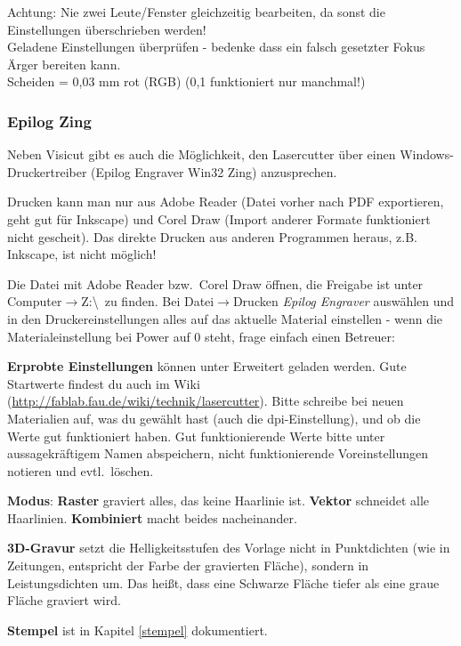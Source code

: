 \documentclass{\basedir/fablab-document}
\renewcommand{\todo}[1]{\textbf{\color{red}{TODO: #1}}}
\begin{document}
	Achtung: Nie zwei Leute/Fenster gleichzeitig bearbeiten, da sonst die Einstellungen überschrieben werden! \\
	Geladene Einstellungen überprüfen - bedenke dass ein falsch gesetzter Fokus Ärger bereiten kann. \\
	Scheiden = 0,03 mm rot (RGB) (0,1 funktioniert nur manchmal!)
	
	\todo{...}
	
	\subsubsection{Epilog Zing}
	
	Neben Visicut gibt es auch die Möglichkeit, den Lasercutter über einen Windows-Druckertreiber (Epilog Engraver Win32 Zing) anzusprechen.
	
	Drucken kann man nur aus Adobe Reader (Datei vorher nach PDF exportieren, geht gut für Inkscape) und Corel Draw (Import anderer Formate funktioniert nicht gescheit).  Das direkte Drucken aus anderen Programmen heraus, z.B. Inkscape, ist nicht möglich!
	
	Die Datei mit Adobe Reader bzw.\  Corel Draw öffnen, die Freigabe ist unter Computer$\rightarrow$Z:\textbackslash \ zu finden. Bei Datei$\rightarrow$Drucken \textit{Epilog Engraver} auswählen und in den Druckereinstellungen alles auf das aktuelle Material einstellen - wenn die Materialeinstellung bei Power auf 0 steht, frage einfach einen Betreuer:
	
	\textbf{Erprobte Einstellungen} können unter Erweitert geladen werden. Gute Startwerte findest du auch im Wiki (\url{http://fablab.fau.de/wiki/technik/lasercutter}). Bitte schreibe bei neuen Materialien auf, was du gewählt hast (auch die dpi-Einstellung), und ob die Werte gut funktioniert haben. Gut funktionierende Werte bitte unter aussagekräftigem Namen abspeichern, nicht funktionierende Voreinstellungen notieren und evtl.\  löschen.
	
	\textbf{Modus}: \textbf{Raster} graviert alles, das keine Haarlinie ist. \textbf{Vektor} schneidet alle Haarlinien. \textbf{Kombiniert} macht beides nacheinander.
	
	\textbf{3D-Gravur} setzt die Helligkeitsstufen des Vorlage nicht in Punktdichten (wie in Zeitungen, entspricht der Farbe der gravierten Fläche), sondern in Leistungsdichten um. Das heißt, dass eine Schwarze Fläche tiefer als eine graue Fläche graviert wird.
	
	\textbf{Stempel} ist in Kapitel \ref{stempel} dokumentiert.
	
\end{document}
